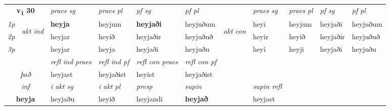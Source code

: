 \noindent
\begin{tabular}{lllllllllll} \toprule
\multicolumn{2}{c}{\textbf{v{\textsubscript{1}}} \Large{\textbf{30}}}  &  \textit{praes sg}  & \textit{praes pl}  &\textit{ pf sg} & \textit{pf pl} &  &  \textit{praes sg}  & \textit{praes pl}  & \textit{pf sg} & \textit{pf pl } \\*
	\cmidrule{3-6} \cmidrule{8-11}
 {\textit{1p}} & \multirow{3}{*}{\begin{turn}{90}\textit{akt ind}\end{turn}} & \textbf{heyja} & heyjum & \textbf{heyjaði} & heyjuðum & \multirow{3}{*}{\begin{turn}{90}\textit{akt con}\end{turn}} &heyi & heyjum & heyjaði & heyjuðum\\*
 {\textit{2p}} &  &  heyjar  & heyið & heyjaðir & heyjuðuð & & heyir & heyið & heyjaðir & heyjuðuð \\*
{\textit{3p}} &  & heyjar & heyja & heyjaði & heyjuðu & & heyi & heyji& heyjaði & heyjuðu \\*
\cmidrule{3-6} \cmidrule{8-11}

 & & \textit{refl ind praes} & \textit{refl ind pf} & \textit{refl con praes} & \textit{refl con pf} \\*
 \multicolumn{2}{c}{ \textit{það} }& heyjast & heyjaðist & heyist & heyjaðist \\*

\cmidrule{3-8}
   \multicolumn{2}{c}{\textit{inf}}  & \textit{i akt sg} & \textit{i akt pl}   & \textit{presp} & \textit{supin} && \textit{supin refl}  \\*
  \multicolumn{2}{c}{\textbf{heyja}} & heyjaðu  & heyið   & heyjandi &  \textbf{heyjað} && heyjast  \\*
\end{tabular}

